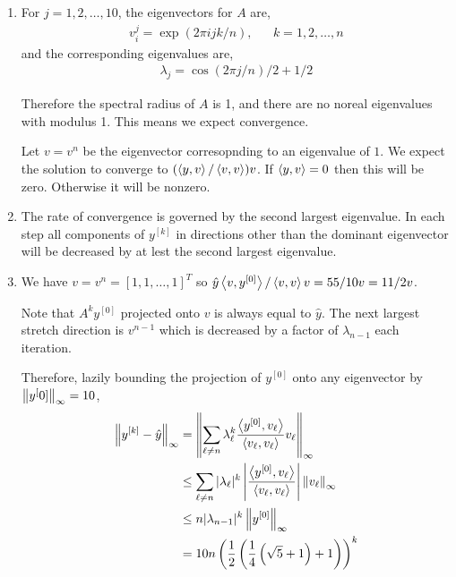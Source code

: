 \documentclass[10pt]{article}
\begin{document}
\begin{solution}[Solution]
\begin{enumerate}[label=(\alph*)]
    \item For \( j=1,2,\ldots, 10 \), the eigenvectors for \( A \) are,
        \begin{align*}
            v_i^j = \exp \left( 2 \pi i j k / n \right), && k=1,2,\ldots, n
        \end{align*}
        and the corresponding eigenvalues are,
        \begin{align*}
            \lambda_j = \cos \left( 2 \pi j / n \right)/2+1/2
        \end{align*}

        Therefore the spectral radius of \( A \) is 1, and there are no noreal eigenvalues with modulus 1. This means we expect convergence.

        Let \( v = v^n\) be the eigenvector corresopnding to an eigenvalue of \( 1 \). We expect the solution to converge to \( (\left\langle y,v \right\rangle / \left\langle v,v \right\rangle )v \). If \( \left\langle y,v \right\rangle = 0 \) then this will be zero. Otherwise it will be nonzero. 
        
    \item The rate of convergence is governed by the second largest eigenvalue. In each step all components of \( y^{[k]} \) in directions other than the dominant eigenvector will be decreased by at lest the second largest eigenvalue.

    \item We have \( v = v^n = [1,1,\ldots, 1]^T \) so \( \hat{y} \left\langle v,y^{[0]} \right\rangle/\left\langle v,v \right\rangle v = 55/10 v = 11/2 v \).

        Note that \( A^k y^{[0]} \) projected onto \( v \) is always equal to \( \hat{y} \). The next largest stretch direction is \( v^{n-1} \) which is decreased by a factor of \( \lambda_{n-1} \) each iteration.

        Therefore, lazily bounding the projection of \( y^{[0]} \) onto any eigenvector by \( \left\lVert y^[0]\right\rVert_\infty = 10 \),
        \begin{align*}
            \left\lVert y^{[k]} - \hat{y}\right\rVert_\infty 
            &= \left\lVert \sum_{\ell \neq n} \lambda_\ell^k \frac{\left\langle y^{[0]},v_\ell \right\rangle}{\left\langle v_\ell,v_\ell \right\rangle}v_\ell \right\rVert_\infty
            \\&\leq \sum_{\ell \neq n} |\lambda_\ell|^k \left| \frac{\left\langle y^{[0]},v_\ell \right\rangle}{\left\langle v_\ell,v_\ell \right\rangle} \right| \left\lVert v_\ell\right\rVert_\infty
            \\&\leq n |\lambda_{n-1}|^k \left\lVert y^{[0]}\right\rVert_\infty
            \\&= 10 n \left( \frac{1}{2} \left(\frac{1}{4} \left(\sqrt{5}+1\right)+1\right) \right)^k
        \end{align*}
        

\end{enumerate}
\end{solution}
\end{document}

